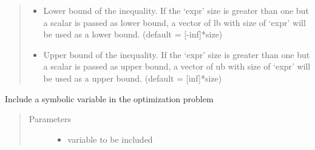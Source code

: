 \documentclass[letterpaper,10pt,english]{sphinxmanual}
\begin{document}
\begin{fulllineitems}
\begin{fulllineitems}
\begin{quote}
\begin{description}
\begin{itemize}
\item {} 
 \textendash{} Lower bound of the inequality. If the ‘expr’ size is greater than one but a scalar is passed as
lower bound, a vector of lb with size of ‘expr’ will be used as a lower bound. (default = {[}-inf{]}*size)

\item {} 
 \textendash{} Upper bound of the inequality. If the  ‘expr’ size is greater than one but a scalar is passed as
upper bound, a vector of ub with size of  ‘expr’ will be used as a upper bound. (default = {[}inf{]}*size)

\end{itemize}

\end{description}\end{quote}

\end{fulllineitems}


\begin{fulllineitems}
\label{\detokenize{yaocptool.optimization:yaocptool.optimization.abstract_optimization_problem.AbstractOptimizationProblem.include_parameter}}
\end{fulllineitems}


\begin{fulllineitems}
\label{\detokenize{yaocptool.optimization:yaocptool.optimization.abstract_optimization_problem.AbstractOptimizationProblem.include_variable}}
Include a symbolic variable in the optimization problem
\begin{quote}\begin{description}
\item[{Parameters}] \leavevmode\begin{itemize}
\item {} 
 \textendash{} variable to be included


\end{itemize}
\end{description}
\end{quote}
\end{fulllineitems}
\end{fulllineitems}
\end{document}
